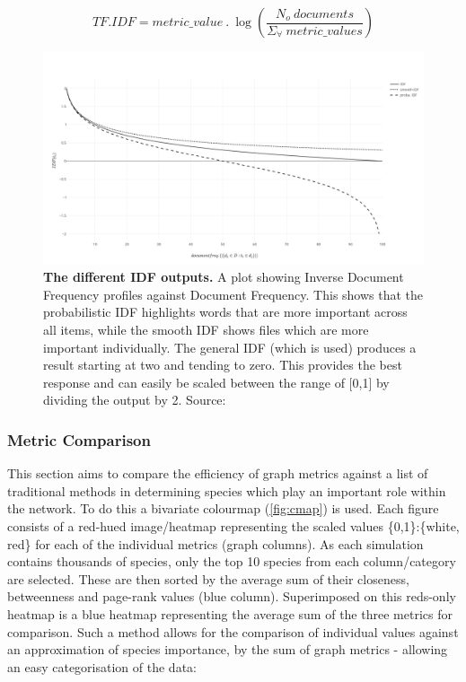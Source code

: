 \begin{equation}
    TF.IDF = metric\_value\  .\ \log(\frac{N_o\ documents}{ \Sigma_\forall\ metric\_values})
\end{equation}


\begin{figure}[H]
     \centering
         \includegraphics[width=\textwidth]{figures_c3/mlpregressor/plotidf.png}
        \caption{ \textbf{The different IDF outputs.} A plot showing Inverse Document Frequency profiles against Document Frequency. This shows that the probabilistic IDF highlights words that are more important across all items, while the smooth IDF shows files which are more important individually. The general IDF (which is used) produces a result starting at two and tending to zero. This provides the best response and can easily be scaled between the range of [0,1] by dividing the output by 2.  Source: \citep{idfpic}}
        \label{fig:idf}
\end{figure}




\subsubsection{Metric Comparison}

This section aims to compare the efficiency of graph metrics against a list of traditional methods in determining species which play an important role within the network. To do this a bivariate colourmap (\autoref{fig:cmap}) is used. Each figure consists of a red-hued image/heatmap representing the scaled values \{0,1\}:\{white, red\} for each of the individual metrics (graph columns). As each simulation contains thousands of species, only the top 10 species from each column/category are selected. These are then sorted by the average sum of their closeness, betweenness and page-rank values (blue column). Superimposed on this reds-only heatmap is a blue heatmap representing the average sum of the three metrics for comparison. Such a method allows for the comparison of individual values against an approximation of species importance, by the sum of graph metrics - allowing an easy categorisation of the data:

